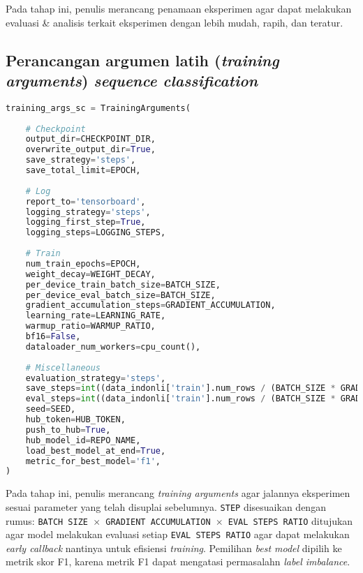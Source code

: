 Pada tahap ini, penulis merancang penamaan eksperimen agar dapat melakukan evaluasi \& analisis terkait eksperimen dengan lebih mudah, rapih, dan teratur.

\subsection{Perancangan argumen latih (\emph{training arguments}) \emph{sequence classification}}
\begin{lstlisting}[language=Python, caption=Perancangan argumen latih (\emph{training arguments}) \emph{sequence classification}]
training_args_sc = TrainingArguments(
        
    # Checkpoint
    output_dir=CHECKPOINT_DIR,
    overwrite_output_dir=True,
    save_strategy='steps',
    save_total_limit=EPOCH,
    
    # Log
    report_to='tensorboard',
    logging_strategy='steps',
    logging_first_step=True,
    logging_steps=LOGGING_STEPS,
    
    # Train
    num_train_epochs=EPOCH,
    weight_decay=WEIGHT_DECAY,
    per_device_train_batch_size=BATCH_SIZE,
    per_device_eval_batch_size=BATCH_SIZE,
    gradient_accumulation_steps=GRADIENT_ACCUMULATION,
    learning_rate=LEARNING_RATE,
    warmup_ratio=WARMUP_RATIO,
    bf16=False,
    dataloader_num_workers=cpu_count(),
    
    # Miscellaneous
    evaluation_strategy='steps',
    save_steps=int((data_indonli['train'].num_rows / (BATCH_SIZE * GRADIENT_ACCUMULATION)) * EVAL_STEPS_RATIO),
    eval_steps=int((data_indonli['train'].num_rows / (BATCH_SIZE * GRADIENT_ACCUMULATION)) * EVAL_STEPS_RATIO),
    seed=SEED,
    hub_token=HUB_TOKEN,
    push_to_hub=True,
    hub_model_id=REPO_NAME,
    load_best_model_at_end=True,
    metric_for_best_model='f1',
)
\end{lstlisting}

Pada tahap ini, penulis merancang \emph{training arguments} agar jalannya eksperimen sesuai parameter yang telah disuplai sebelumnya. \texttt{STEP} disesuaikan dengan rumus: \texttt{BATCH SIZE $\times$ GRADIENT ACCUMULATION $\times$ EVAL STEPS RATIO} ditujukan agar model melakukan evaluasi setiap \texttt{EVAL STEPS RATIO} agar dapat melakukan \emph{early callback} nantinya untuk efisiensi \emph{training}. Pemilihan \emph{best model} dipilih ke metrik skor F1, karena metrik F1 dapat mengatasi permasalahn \emph{label imbalance}.

